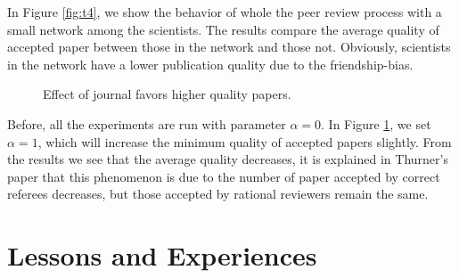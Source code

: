 \documentclass[11pt]{article}
\begin{document}
In Figure \ref{fig:t4}, we show the behavior of whole the peer review process with a small network among the scientists. The results compare the average quality of accepted paper between those in the network and those not. Obviously, scientists in the network have a lower publication quality due to the friendship-bias.

\begin{figure}[H]
    \begin{center}
    \caption{Effect of journal favors higher quality papers.}
    \label{fig:t5}
    \end{center}
\end{figure}

Before, all the experiments are run with parameter $\alpha = 0$. In Figure \ref{fig:t5}, we set $\alpha = 1$, which will increase the minimum quality of accepted papers slightly. From the results we see that the average quality decreases, it is explained in Thurner's paper that this phenomenon is due to the number of paper accepted by correct referees decreases, but those accepted by rational reviewers remain the same.

\section{Lessons and Experiences}

\renewcommand{\refname}{\section{References}}


\end{document}
